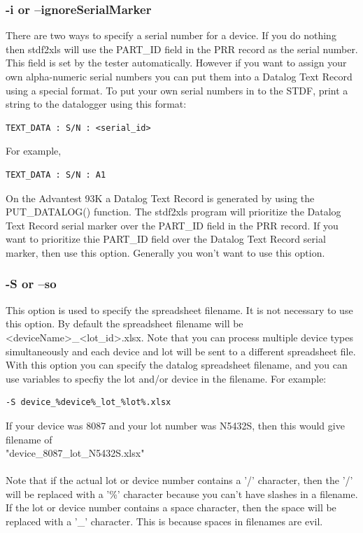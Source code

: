 \documentclass[letterpaper]{article}
\begin{document}
\subsubsection{\bf -i or --ignoreSerialMarker}
There are two ways to specify a serial number for a device.  If you do nothing then stdf2xls
will use the PART\_ID field in the PRR record as the serial number.  This field is set by the tester
automatically. However if you want to assign your own alpha-numeric serial numbers you can put
them into a Datalog Text Record using a special format.  To put your own serial numbers
in to the STDF, print a string to the datalogger using this format:
\begin{verbatim}
TEXT_DATA : S/N : <serial_id>
\end{verbatim}
For example,
\begin{verbatim}
TEXT_DATA : S/N : A1
\end{verbatim}
On the Advantest 93K a Datalog Text Record is generated by using the PUT\_DATALOG() function.
The stdf2xls program will prioritize the Datalog Text Record serial marker over the
PART\_ID field in the PRR record.  If you want to prioritize thie PART\_ID field over
the Datalog Text Record serial marker, then use this option.  Generally you won't want
to use this option.

\subsubsection{\bf -S or --so}
This option is used to specify the spreadsheet filename.  It is not necessary to use this option.
By default the spreadsheet filename will be <deviceName>\_<lot\_id>.xlsx.  Note that you can process
multiple device types simultaneously and each device and lot will be sent to a different spreadsheet
file.  With this option you can specify the datalog spreadsheet filename, and you can use variables
to specfiy the lot and/or device in the filename.  For example:
\begin{verbatim}
-S device_%device%_lot_%lot%.xlsx
\end{verbatim}
If your device was 8087 and your lot number was N5432S, then this would
give filename of\\ "device\_8087\_lot\_N5432S.xlsx"\\\\   Note that if the actual lot or device
number contains a '/' character, then the '/' will be replaced with a '\%' character
because you can't have slashes in a filename.  If the lot or device number contains
a space character, then the space will be replaced with a '\_' character.  This is because
spaces in filenames are evil.
\end{document}
